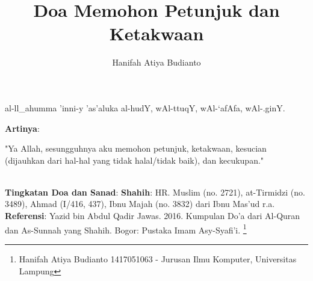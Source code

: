 \documentclass[a4paper,12pt]{article}
\title{\Large Doa Memohon Petunjuk dan Ketakwaan}
\author{\calligra Hanifah Atiya Budianto}
\begin{document}
\sffamily
\maketitle 
\fullvocalize
{}
\begin{arabtext}
\noindent
al-ll_ahumma 'inni-y 'as'aluka al-hudY, wAl-ttuqY, wAl-`afAfa, wAl-.ginY.\\
\end{arabtext}
\noindent
\textbf{Artinya}:
\par
\indent
"Ya Allah, sesungguhnya aku memohon petunjuk, ketakwaan, kesucian 
(dijauhkan dari hal-hal yang tidak halal/tidak baik), dan kecukupan."\\\\
\par
\noindent
\textbf{Tingkatan Doa dan Sanad}: \textbf{Shahih}: HR. Muslim (no. 2721), 
at-Tirmidzi (no. 3489), Ahmad (I/416, 437), Ibnu Majah (no. 3832) dari Ibnu 
Mas'ud r.a.\\
\textbf{Referensi}: Yazid bin Abdul Qadir Jawas. 2016. Kumpulan Do'a dari
Al-Quran dan As-Sunnah yang Shahih. Bogor: Pustaka Imam Asy-Syafi'i.
\footnote{Hanifah Atiya Budianto 1417051063 - Jurusan Ilmu Komputer,
Universitas Lampung}
\end{document}
